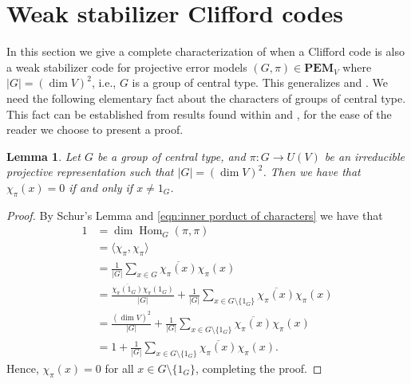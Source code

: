 \documentclass[11pt, oneside, reqno]{amsart}
\newcommand{\PEM}{\mathbf{PEM}}
\newcommand{\Hom}{\operatorname{Hom}}
\theoremstyle{definition}
\theoremstyle{plain}
\newtheorem{lemma}[definition]{Lemma}
\theoremstyle{remark}
\begin{document}
\section{Weak stabilizer Clifford codes}\label{sec:weak stabilizer Clifford codes}

In this section we give a complete characterization of when a Clifford code is also a weak stabilizer code for projective error models $(G,\pi) \in \PEM_V$ where $|G| = (\dim V)^2$, i.e., $G$ is a group of central type. This generalizes \cite[Theorem 3]{KlappeneckerRötteler04} and \cite[Corollary 4.2]{GrasslMartínezNicolás10}. We need the following elementary fact about the characters of groups of central type. This fact can be established from results found within \cite{CeccheriniSilbersteinTullio22} and \cite{Cheng15}, for the ease of the reader we choose to present a proof.

\begin{lemma}\label{lemma:character of group of central type}
    Let $G$ be a group of central type, and $\pi \colon G \to U(V)$ be an irreducible projective representation such that $|G| = (\dim V)^2$. Then we have that $\chi_{\pi}(x) = 0$ if and only if $x \neq 1_G$.
\end{lemma}
\begin{proof}
    By Schur's Lemma and \cref{eqn:inner porduct of characters} we have that
    \begin{align*}
        1
        & = \dim \Hom_G(\pi, \pi) \\
        & = \langle \chi_\pi, \chi_\pi \rangle \\
        & = \frac{1}{|G|}\sum_{x \in G}\overline{\chi_\pi(x)}\chi_\pi(x) \\
        & = \frac{\overline{\chi_\pi(1_G)}\chi_\pi(1_G)}{|G|} + \frac{1}{|G|}\sum_{x \in G \setminus \{1_G\}}\overline{\chi_\pi(x)}\chi_\pi(x) \\
        & = \frac{(\dim V)^2}{|G|} + \frac{1}{|G|}\sum_{x \in G \setminus \{1_G\}}\overline{\chi_\pi(x)}\chi_\pi(x) \\
        & = 1 + \frac{1}{|G|}\sum_{x \in G \setminus \{1_G\}}\overline{\chi_\pi(x)}\chi_\pi(x).
    \end{align*}
    Hence, $\chi_\pi(x) = 0$ for all $x \in G \setminus \{1_G\}$, completing the proof.
\end{proof}
\end{document}
